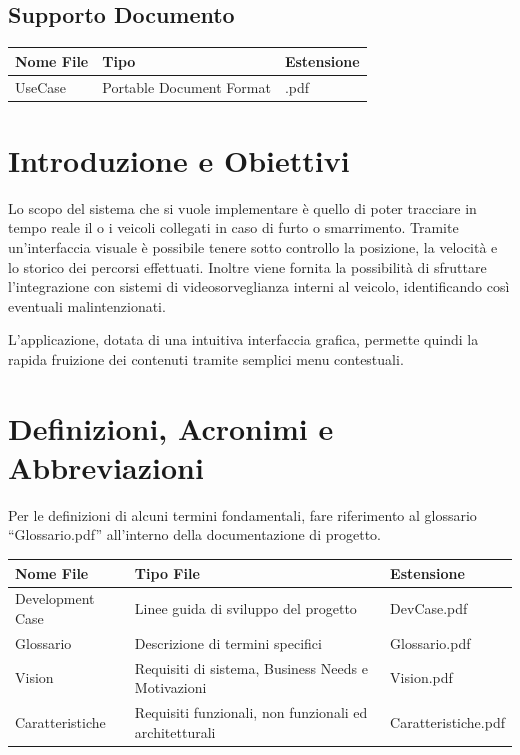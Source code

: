 \documentclass[a4paper,12pt]{article}
\begin{document}
\subsection{Supporto Documento}
\begin{table}[ht]
\begin{center}
\begin{tabular}{p{6cm} p{5cm} p{2cm}}
\rowcolor{Ash}
\hline
Nome File & Tipo & Estensione \\ \hline
UseCase & Portable Document Format & .pdf \\ \hline
\end{tabular}
\end{center}
\end{table}

\clearpage

\pagebreak

\section{Introduzione e Obiettivi}

Lo scopo del sistema che si vuole implementare è quello di poter tracciare in tempo reale il o i veicoli collegati in caso di furto o smarrimento. Tramite un'interfaccia visuale è possibile tenere sotto controllo la posizione, la velocità e lo storico dei percorsi effettuati. Inoltre viene fornita la possibilità di sfruttare l'integrazione con sistemi di videosorveglianza interni al veicolo, identificando così eventuali malintenzionati. 

L'applicazione, dotata di una intuitiva interfaccia grafica, permette quindi la rapida fruizione dei contenuti tramite semplici menu contestuali.


\section{Definizioni, Acronimi e Abbreviazioni}

Per le definizioni di alcuni termini fondamentali, fare riferimento al glossario ``Glossario.pdf'' all'interno della documentazione di progetto.

\begin{table}[h]
\begin{center}
\begin{tabular}{ p{4.5cm} p{4.5cm} p{3.5cm} } 
\rowcolor{Ash}	
\hline	
Nome File & Tipo File & Estensione  \\ \hline
Development Case & Linee guida di sviluppo del progetto & DevCase.pdf  \\ 
Glossario & Descrizione di termini specifici & Glossario.pdf  \\ 
Vision & Requisiti di sistema, Business Needs e Motivazioni & Vision.pdf  \\ 
Caratteristiche & Requisiti funzionali, non funzionali ed architetturali & Caratteristiche.pdf  \\ \hline
\end{tabular}
\end{center}
\end{table}
\end{document}
